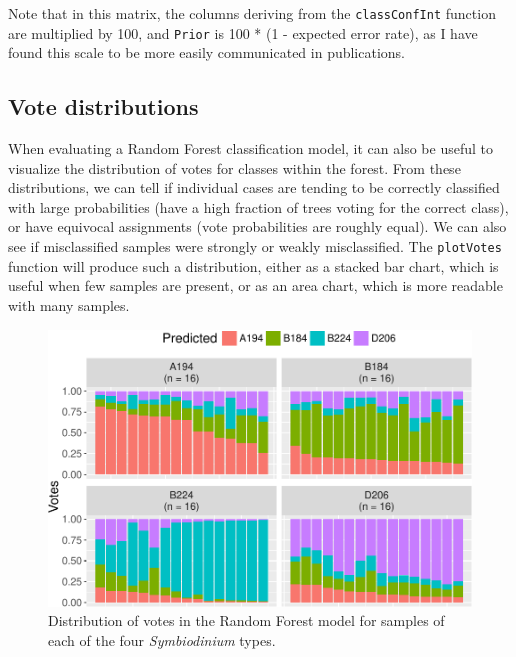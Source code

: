 Note that in this matrix, the columns deriving from the
\texttt{classConfInt} function are multiplied by 100, and \texttt{Prior}
is 100 * (1 - expected error rate), as I have found this scale to be
more easily communicated in publications.

\subsection{Vote distributions}\label{vote-distributions}

When evaluating a Random Forest classification model, it can also be
useful to visualize the distribution of votes for classes within the
forest. From these distributions, we can tell if individual cases are
tending to be correctly classified with large probabilities (have a high
fraction of trees voting for the correct class), or have equivocal
assignments (vote probabilities are roughly equal). We can also see if
misclassified samples were strongly or weakly misclassified. The
\texttt{plotVotes} function will produce such a distribution, either as
a stacked bar chart, which is useful when few samples are present, or as
an area chart, which is more readable with many samples.

\begin{Schunk}
\begin{figure}
\includegraphics{archer_files/figure-latex/plotVotes-1} \caption[Distribution of votes in the Random Forest model for samples of each of the four \textit{Symbiodinium} types]{Distribution of votes in the Random Forest model for samples of each of the four \textit{Symbiodinium} types.}\label{fig:plotVotes}
\end{figure}
\end{Schunk}


